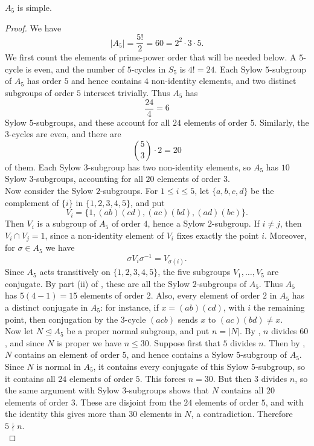 \documentclass[../Odyssey_Project.tex]{subfiles}
\begin{document}
\begin{theorem}
\label{thm:7.4}
$A_5$ is simple.
\end{theorem}
\begin{proof}
We have
\[
    |A_5|=\frac{5!}{2}=60=2^2\cdot 3\cdot 5.
\]
We first count the elements of prime-power order that will be needed below. A $5$-cycle is even, and the number of $5$-cycles in $S_5$ is $4!=24$. Each Sylow $5$-subgroup of $A_5$ has order $5$ and hence contains $4$ non-identity elements, and two distinct subgroups of order $5$ intersect trivially. Thus $A_5$ has
\[
    \frac{24}{4}=6
\]
Sylow $5$-subgroups, and these account for all $24$ elements of order $5$. Similarly, the $3$-cycles are even, and there are
\[
    \binom{5}{3}\cdot 2=20
\]
of them. Each Sylow $3$-subgroup has two non-identity elements, so $A_5$ has $10$ Sylow $3$-subgroups, accounting for all $20$ elements of order $3$.\\
Now consider the Sylow $2$-subgroups. For $1\leq i\leq 5$, let $\{a,b,c,d\}$ be the complement of $\{i\}$ in $\{1,2,3,4,5\}$, and put
\[
    V_i=\{1,(ab)(cd),(ac)(bd),(ad)(bc)\}.
\]
Then $V_i$ is a subgroup of $A_5$ of order $4$, hence a Sylow $2$-subgroup. If $i\neq j$, then $V_i\cap V_j=1$, since a non-identity element of $V_i$ fixes exactly the point $i$. Moreover, for $\sigma\in A_5$ we have
\[
    \sigma V_i\sigma^{-1}=V_{\sigma(i)}.
\]
Since $A_5$ acts transitively on $\{1,2,3,4,5\}$, the five subgroups $V_1,\ldots,V_5$ are conjugate. By part (ii) of , these are all the Sylow $2$-subgroups of $A_5$. Thus $A_5$ has $5(4-1)=15$ elements of order $2$. Also, every element of order $2$ in $A_5$ has a distinct conjugate in $A_5$: for instance, if $x=(ab)(cd)$, with $i$ the remaining point, then conjugation by the $3$-cycle $(acb)$ sends $x$ to $(ac)(bd)\neq x$.\\
Now let $N\trianglelefteq A_5$ be a proper normal subgroup, and put $n=|N|$. By , $n$ divides $60$, and since $N$ is proper we have $n\leq 30$. Suppose first that $5$ divides $n$. Then by , $N$ contains an element of order $5$, and hence contains a Sylow $5$-subgroup of $A_5$. Since $N$ is normal in $A_5$, it contains every conjugate of this Sylow $5$-subgroup, so it contains all $24$ elements of order $5$. This forces $n=30$. But then $3$ divides $n$, so the same argument with Sylow $3$-subgroups shows that $N$ contains all $20$ elements of order $3$. These are disjoint from the $24$ elements of order $5$, and with the identity this gives more than $30$ elements in $N$, a contradiction. Therefore $5\nmid n$.\\

\end{proof}
\end{document}
